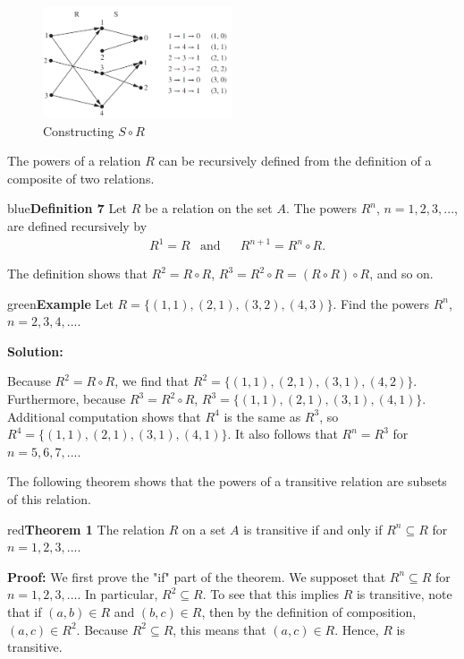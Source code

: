 \documentclass[11pt]{article}
\newenvironment{example}[1][\unskip]{\begin{mybox}{green}{\textbf{Example} {#1}}}{\end{mybox}}
\newenvironment{definition}[1]{\begin{mybox}{blue}{\textbf{Definition #1}}}{\end{mybox}}
\newenvironment{theorem}[1]{\begin{mybox}{red}{\textbf{Theorem #1}}}{\end{mybox}}
\begin{document}
\begin{figure}[h!]
    \centering
    \includegraphics[width=0.5\textwidth]{img/Contructing-S_o_R.png}
    \caption{Constructing $S \circ R$}
    \label{fig:my_label}
\end{figure}


The powers of a relation $R$ can be recursively defined from the definition of a composite of two relations.

\begin{definition}{7}
Let $R$ be a relation on the set $A$. The powers $R^n$, $n = 1, 2, 3, ...$, are defined recursively by
\begin{align*}
    &R^1 = R &\text{and}& &R^{n+1} = R^n \circ R.
\end{align*}
\end{definition}

The definition shows that $R^2 = R \circ R$, $R^3 = R^2 \circ R = (R \circ R) \circ R$, and so on.

\begin{example}
Let $R = \{(1, 1), (2, 1), (3, 2), (4, 3)\}$. Find the powers $R^n$, $n = 2, 3, 4, ...$.

\textbf{Solution:}

Because $R^2 = R \circ R$, we find that $R^2 = \{(1, 1), (2, 1), (3, 1), (4, 2)\}$. Furthermore, because $R^3 = R^2 \circ R$, $R^3 = \{(1, 1), (2, 1), (3, 1), (4, 1)\}$. Additional computation shows that $R^4$ is the same as $R^3$, so $R^4 = \{(1, 1), (2, 1), (3, 1), (4, 1)\}$. It also follows that $R^n = R^3$ for $n =
5, 6, 7, ...$.
\end{example}


The following theorem shows that the powers of a transitive relation are subsets of this relation.
\begin{theorem}{1}
The relation $R$ on a set $A$ is transitive if and only if $R^n \subseteq R$ for $n = 1, 2, 3, ...$.
\end{theorem}

\textbf{Proof:} We first prove the "if" part of the theorem. We supposet that $R^n \subseteq R$ for $n = 1, 2, 3, ...$. In particular, $R^2 \subseteq R$. To see that this implies $R$ is transitive, note that if $(a, b) \in R$ and $(b, c) \in R$, then by the definition of composition, $(a, c) \in R^2$. Because $R^2 \subseteq R$, this means that $(a, c) \in R$. Hence, $R$ is transitive.
\end{document}
